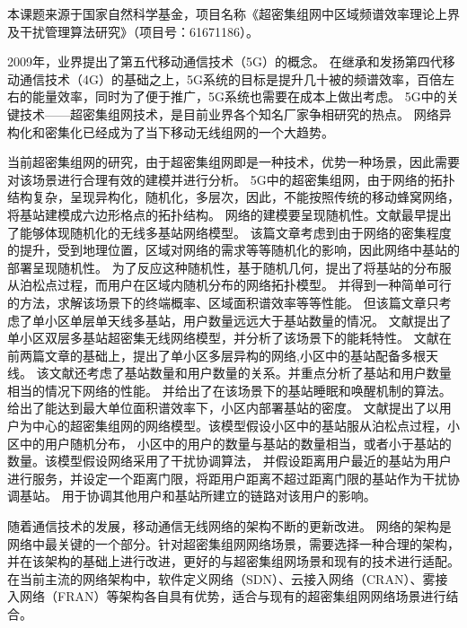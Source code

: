 本课题来源于国家自然科学基金，项目名称《超密集组网中区域频谱效率理论上界及干扰管理算法研究》（项目号：61671186）。


2009年，业界提出了第五代移动通信技术（5G）的概念。
在继承和发扬第四代移动通信技术（4G）的基础之上，5G系统的目标是提升几十被的频谱效率，百倍左右的能量效率，同时为了便于推广，5G系统也需要在成本上做出考虑。
5G中的关键技术——超密集组网技术，是目前业界各个知名厂家争相研究的热点\cite{zhanghong}。
网络异构化和密集化已经成为了当下移动无线组网的一个大趋势。

当前超密集组网的研究，由于超密集组网即是一种技术，优势一种场景，因此需要对该场景进行合理有效的建模并进行分析。
5G中的超密集组网，由于网络的拓扑结构复杂，呈现异构化，随机化，多层次，因此，不能按照传统的移动蜂窝网络，将基站建模成六边形格点的拓扑结构。
网络的建模要呈现随机性。文献\cite{ATractable}最早提出了能够体现随机化的无线多基站网络模型。
该篇文章考虑到由于网络的密集程度的提升，受到地理位置，区域对网络的需求等等随机化的影响，因此网络中基站的部署呈现随机性。
为了反应这种随机性，基于随机几何，提出了将基站的分布服从泊松点过程，而用户在区域内随机分布的网络拓扑模型。
并得到一种简单可行的方法，求解该场景下的终端概率、区域面积谱效率等等性能。
但该篇文章只考虑了单小区单层单天线多基站，用户数量远远大于基站数量的情况。
文献\cite{2LayerPC}提出了单小区双层多基站超密集无线网络模型，并分析了该场景下的能耗特性。
文献\cite{UDNMIMO}在前两篇文章的基础上，提出了单小区多层异构的网络,小区中的基站配备多根天线。
该文献还考虑了基站数量和用户数量的关系。并重点分析了基站和用户数量相当的情况下网络的性能。
并给出了在该场景下的基站睡眠和唤醒机制的算法。给出了能达到最大单位面积谱效率下，小区内部署基站的密度。
文献\cite{user-centric}提出了以用户为中心的超密集组网的网络模型。该模型假设小区中的基站服从泊松点过程，小区中的用户随机分布，
小区中的用户的数量与基站的数量相当，或者小于基站的数量。该模型假设网络采用了干扰协调算法，
并假设距离用户最近的基站为用户进行服务，并设定一个距离门限，将距用户距离不超过距离门限的基站作为干扰协调基站。
用于协调其他用户和基站所建立的链路对该用户的影响。

随着通信技术的发展，移动通信无线网络的架构不断的更新改进。
网络的架构是网络中最关键的一个部分。针对超密集组网网络场景，需要选择一种合理的架构，并在该架构的基础上进行改进，更好的与超密集组网场景和现有的技术进行适配。
在当前主流的网络架构中，软件定义网络（SDN）、云接入网络（CRAN）、雾接入网络（FRAN）等架构各自具有优势，适合与现有的超密集组网网络场景进行结合。

